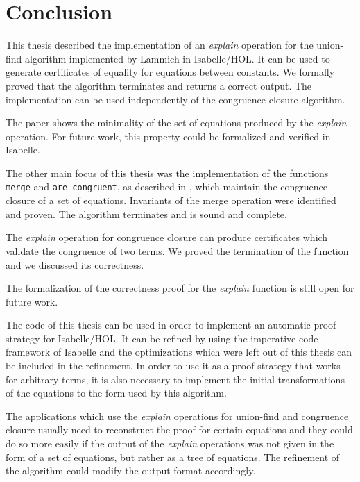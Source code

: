 
\chapter{Conclusion}\label{chapter:conclusion}

This thesis described the implementation of an \emph{explain} operation for the union-find algorithm implemented by Lammich \cite{unionfind-isabelle} in Isabelle/HOL. It can be used to generate certificates of equality for equations between constants. We formally proved that the algorithm terminates and returns a correct output. The implementation can be used independently of the congruence closure algorithm.

The paper \cite{Nieuwenhuis} shows the minimality of the set of equations produced by the \emph{explain} operation. For future work, this property could be formalized and verified in Isabelle.

The other main focus of this thesis was the implementation of the functions \lstinline|merge| and \lstinline|are_congruent|, as described in \cite{Nieuwenhuis}, which maintain the congruence closure of a set of equations. Invariants of the merge operation were identified and proven. The algorithm terminates and is sound and complete.

The \emph{explain} operation for congruence closure can produce certificates which validate the congruence of two terms. We proved the termination of the function and we discussed its correctness.

The formalization of the correctness proof for the \emph{explain} function is still open for future work.

The code of this thesis can be used in order to implement an automatic proof strategy for Isabelle/HOL. It can be refined by using the imperative code framework of Isabelle \cite{imperativehol} and the optimizations which were left out of this thesis can be included in the refinement. In order to use it as a proof strategy that works for arbitrary terms, it is also necessary to implement the initial transformations of the equations to the form used by this algorithm.

The applications which use the \emph{explain} operations for union-find and congruence closure usually need to reconstruct the proof for certain equations and they could do so more easily if the output of the \emph{explain} operations was not given in the form of a set of equations, but rather as a tree of equations. The refinement of the algorithm could modify the output format accordingly.

